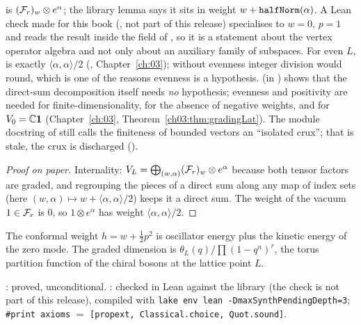 \begin{dictionary}
 is $(\mathcal{F}_r)_w\otimes e^\alpha$; the library lemma says it sits in weight
$w+\lean{halfNorm}(\alpha)$. A Lean check made for this book (, not part of this release) specialises to
$w=0$, $p=1$ and reads the result inside the
 field of , so it is a statement about the vertex operator algebra and not only
about an auxiliary family of subspaces. For even $L$,  is exactly $\langle\alpha,\alpha\rangle/2$
(, Chapter~\ref{ch:03}); without evenness integer division would round, which is one of the
reasons evenness is a hypothesis.  (in )
shows that the direct-sum decomposition itself needs \emph{no} hypothesis; evenness and positivity are needed for
finite-dimensionality, for the absence of negative weights, and for $V_0={\mathbb{C}}\mathbf{1}$
(Chapter~\ref{ch:03}, Theorem~\ref{ch03:thm:gradingLat}). The module docstring of
 still calls the finiteness of bounded vectors an ``isolated crux''; that is
stale, the crux is discharged ().
\end{dictionary}

\begin{proof}[Proof on paper]
Internality: $V_L=\bigoplus_{(w,\alpha)}(\mathcal{F}_r)_w\otimes e^\alpha$ because both tensor factors are graded, and
regrouping the pieces of a direct sum along any map of index sets (here $(w,\alpha)\mapsto w+\langle\alpha,\alpha\rangle/2$)
keeps it a direct sum. The weight of the vacuum $1\in\mathcal{F}_r$ is $0$, so $1\otimes e^\alpha$ has weight
$\langle\alpha,\alpha\rangle/2$.
\end{proof}

\begin{physics}
The conformal weight $h=w+\frac12p^2$ is oscillator energy plus the kinetic energy of the zero mode. The
graded dimension is $\theta_L(q)/\prod(1-q^n)^r$, the torus partition function of the chiral bosons at the
lattice point $L$.
\end{physics}

\begin{status}
: proved, unconditional. : checked in Lean against the library (the check is not part of this release),
compiled with \texttt{lake env lean -DmaxSynthPendingDepth=3}; \texttt{\#print axioms} $=$
\texttt{[propext, Classical.choice, Quot.sound]}.
\end{status}

